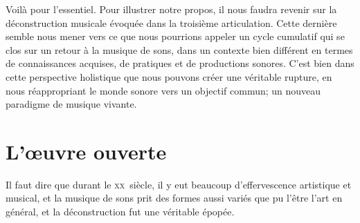 \documentclass{article}
\begin{document}






\bigskip

Voilà pour l'essentiel. Pour illustrer notre propos, il nous faudra revenir sur la déconstruction musicale évoquée dans la troisième articulation. Cette dernière semble nous mener vers ce que nous pourrions appeler un cycle cumulatif qui se clos sur un retour à la musique de sons, dans un contexte bien différent en termes de connaissances acquises, de pratiques et de productions sonores. %
C'est bien dans cette perspective holistique que nous pouvons créer une véritable rupture, en nous réappropriant le monde sonore vers un objectif commun; un nouveau paradigme de musique vivante.

\bigskip

%    
  

\section{L'œuvre ouverte}

Il faut dire que durant le \textsc{xx}\ieme ~siècle, il y eut beaucoup d'effervescence artistique et musical, et la musique de sons prit des formes aussi variés que pu l'être l'art en général, et la déconstruction fut une véritable épopée.
\end{document}

